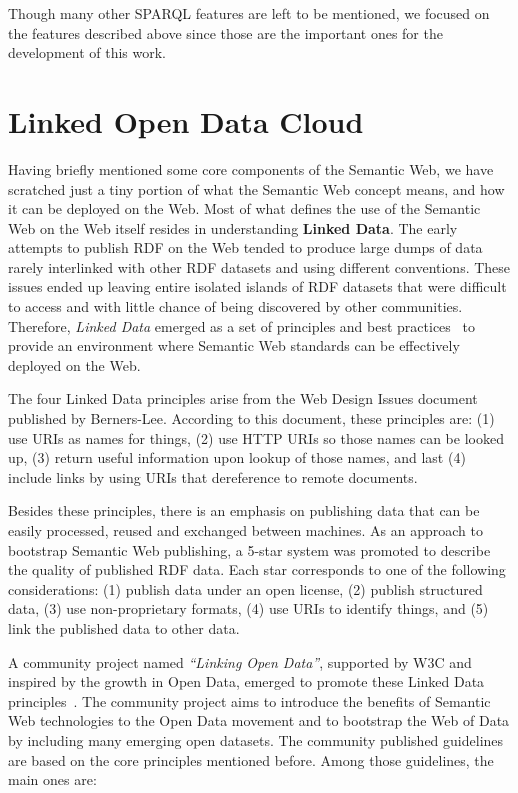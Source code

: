Though many other SPARQL features are left to be mentioned, we focused on the features described 
above since those are the important ones for the development of this work.

\section{Linked Open Data Cloud}
Having briefly mentioned some core components of the Semantic Web, we have scratched just a tiny 
portion of what the Semantic Web concept means, and how it can be deployed on the Web. Most of 
what defines the use of the Semantic Web on the Web itself resides in understanding 
\textbf{Linked Data}. The early attempts to publish RDF on the Web tended to produce large dumps 
of data rarely interlinked with other RDF datasets and using different conventions. These issues 
ended up leaving entire isolated islands of RDF datasets that were difficult to access and with 
little chance of being discovered by other communities. Therefore, \textit{Linked Data} emerged as 
a set of principles and best practices~\cite{key:ldprinciples} to provide an environment where 
Semantic Web standards can be effectively deployed on the Web.

The four Linked Data principles arise from the Web Design Issues document published by 
Berners-Lee\cite{key:ldprinciples}. According to this document, these principles are: (1) use URIs 
as names for things, (2) use HTTP URIs so those names can be looked up, (3) return useful 
information upon lookup of those names, and last (4) include links by using URIs that dereference 
to remote documents. 

Besides these principles, there is an emphasis on publishing data that can be easily processed, 
reused and exchanged between machines. As an approach to bootstrap Semantic Web publishing, 
a 5-star system\cite{key:ldprinciples} was promoted to describe the quality of published RDF data. 
Each star corresponds to one of the following considerations: (1) publish data under an open license, 
(2) publish structured data, (3) use non-proprietary formats, (4) use URIs to identify things, and 
(5) link the published data to other data.

A community project named \textit{“Linking Open Data”}, supported by W3C and inspired by the growth 
in Open Data, emerged to promote these Linked Data principles~\cite{key:ldbook}. The community 
project aims to introduce the benefits of Semantic Web technologies to the Open Data movement and 
to bootstrap the Web of Data by including many emerging open datasets. The community published 
guidelines are based on the core principles mentioned before. Among those guidelines, the main 
ones are:

